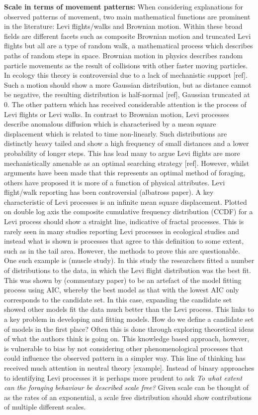 \documentclass[11pt,usenames,dvipsnames]{article}
\begin{document}
\textbf{Scale in terms of movement patterns:} When considering explanations for observed patterns of movement, two main mathematical functions are prominent in the literature: Levi flights/walks and Brownian motion. Within these broad fields are different facets such as composite Brownian motion and truncated Levi flights but all are a type of random walk, a mathematical process which describes paths of random steps in space. Brownian motion in physics describes random particle movements as the result of collisions with other faster moving particles. In ecology this theory is controversial due to a lack of mechanistic support [ref]. Such a motion should show a more Gaussian distribution, but as distance cannot be negative, the resulting distribution is half-normal [ref], Gaussian truncated at 0. The other pattern which has received considerable attention is the process of Levi flights or Levi walks. In contrast to Brownian motion, Levi processes describe anomalous diffusion which is characterised by a mean square displacement which is related to time non-linearly. Such distributions are distinctly heavy tailed and show a high frequency of small distances and a lower probability of longer steps. This has lead many to argue Levi flights are more mechanistically amenable as an optimal searching strategy [ref]. However, whilst arguments have been made that this represents an optimal method of foraging, others have proposed it is more of a function of physical attributes. Levi flight/walk reporting has been controversial (albatross paper). A key characteristic of Levi processes is an infinite mean square displacement. Plotted on double log axis the composite cumulative frequency distribution (CCDF) for a Levi process should show a straight line, indicative of fractal processes. This is rarely seen in many studies reporting Levi processes in ecological studies and instead what is shown is processes that agree to this definition to some extent, such as in the tail area. However, the methods to prove this are questionable. One such example is (muscle study). In this study the researchers fitted a number of distributions to the data, in which the Levi flight distribution was the best fit. This was shown by (commentary paper) to be an artefact of the model fitting process using AIC, whereby the best model as that with the lowest AIC only corresponds to the candidate set. In this case, expanding the candidate set showed other models fit the data much better than the Levi process. This links to a key problem in developing and fitting models. How do we define a candidate set of models in the first place? Often this is done through exploring theoretical ideas of what the authors think is going on. This knowledge based approach, however, is vulnerable to bias by not considering other phenomenological processes that could influence the observed pattern in a simpler way. This line of thinking has received much attention in neutral theory [example]. Instead of binary approaches to identifying Levi processes it is perhaps more prudent to ask \textit{To what extent can the foraging behaviour be described scale free?} Given scale can be thought of as the rates of an exponential, a scale free distribution should show contributions of multiple different scales. 
\end{document}
